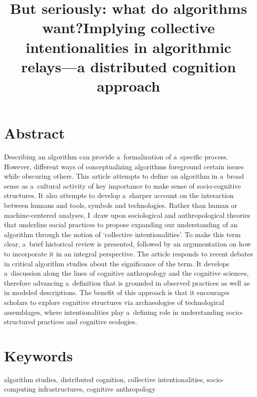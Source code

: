 

\title{But seriously: what do algorithms want?}
\maketitle

\title{Implying collective intentionalities in algorithmic relays—a distributed cognition approach}
\maketitle

\section*{Abstract}
Describing an algorithm can provide a~formalization of a~specific process. However, different ways of conceptualizing algorithms foreground certain issues while obscuring others. This article attempts to define an algorithm in a~broad sense as a~cultural activity of key importance to make sense of socio-cognitive structures. It also attempts to develop a~sharper account on the interaction between humans and tools, symbols and technologies. Rather than human or machine-centered analyses, I~draw upon sociological and anthropological theories that underline social practices to propose expanding our understanding of an algorithm through the notion of ‘collective intentionalities'. To make this term clear, a~brief historical review is presented, followed by an argumentation on how to incorporate it in an integral perspective. The article responds to recent debates in critical algorithm studies about the significance of the term. It develops a~discussion along the lines of cognitive anthropology and the cognitive sciences, therefore advancing a~definition that is grounded in observed practices as well as in modeled descriptions. The benefit of this approach is that it encourages scholars to explore cognitive structures via archaeologies of technological assemblages, where intentionalities play a~defining role in understanding socio-structured practices and cognitive ecologies.

\section*{Keywords}
algorithm studies, distributed cognition, collective intentionalities, socio-computing infrastructures, cognitive anthropology


